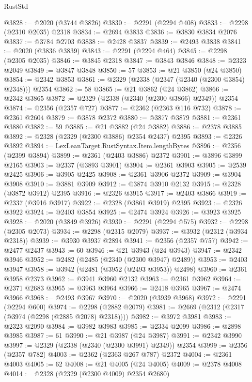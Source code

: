 \begin{lexlean}{RustStd}
\begin{coremodule}
@3828 := @2020 (@3744 @3826)
@3830 := @2291 (@2294 @408)
@3833 := @2298 (@2310 @2035) @2318
@3834 := @2694 @3833
@3836 := @3830 @3834 @2076
@3837 := @3784 @2703
@3838 := @2428 @3837
@3839 := @2493 @3838
@3841 := @2020 (@3836 @3839)
@3843 := @2291 (@2294 @464)
@3845 := @2298 (@2305 @2035)
@3846 := @3845 @2318
@3847 := @3843 @3846
@3848 := @2323 @2049
@3849 := @3847 @3848
@3850 := 57
@3853 := @21 @3850 (@24 @3850)
@3854 := @2342 @3853
@3861 := @2329 (@2338 (@2347 (@2340 (@2300 @3854) @2348))) @2354
@3862 := 58
@3865 := @21 @3862 (@24 @3862)
@3866 := @2342 @3865
@3872 := @2329 (@2338 (@2340 (@2300 @3866) @2349)) @2354
@3874 := @2356 (@2357 @727)
@3877 := @2362 (@2363 @116 @732)
@3878 := @2361 @2604
@3879 := @3878 @2372
@3880 := @3877 @3879
@3881 := @2361 @3880
@3882 := 59
@3885 := @21 @3882 (@24 @3882)
@3886 := @2378 @3885
@3892 := @2328 (@2329 (@2300 @3886) @2354 @2437) @2395
@3893 := @2326 @3892
@3894 := LexLeanTarget.RustSyntax.Item.lengthBytes
@3896 := @2356 (@2399 @3894)
@3899 := @2361 (@2403 @3886) @2372
@3901 := @3896 @3899 @2165
@3903 := @2337 (@3893 @3901)
@3904 := @2361 @3903
@3905 := @2539 @2425
@3906 := @3905 @2425
@3908 := @2361 @3906 @2372
@3909 := @3904 @3908
@3910 := @3881 @3909
@3912 := @3874 @3910 @2132
@3915 := @2328 (@3872 @3912) @2395
@3916 := @2326 @3915
@3917 := @2403 @3866
@3919 := @2337 (@3916 @3917)
@3922 := @2328 (@3861 @3919) @2395
@3923 := @2326 @3922
@3924 := @2403 @3854
@3925 := @2474 @3924
@3926 := @3923 @3925
@3928 := @2020 (@3849 @3926)
@3930 := @2291 (@2294 @575)
@3932 := @2298 (@2305 @2073)
@3934 := @2298 (@2315 @2079)
@3937 := @3932 (@2312 (@3934 @2318))
@3939 := @3930 @3937 @2894
@3941 := @2356 (@2357 @757)
@3942 := @2477 @2437
@3943 := 60
@3946 := @21 @3943 (@24 @3943)
@3947 := @2342 @3946
@3952 := @2482 (@2485 (@2340 (@2300 @3947) @2489))
@3953 := @2403 @3947
@3958 := @3942 (@2481 (@3952 (@2493 @3953)) @2498)
@3960 := @2361 @3958 @2373
@3962 := @3941 @3960 @2132
@3963 := @2361 @3962
@3964 := @2371 @2683
@3965 := @3963 @3964
@3966 := @2418 @3965
@3967 := @2474 @3966
@3968 := @2493 @3967
@3970 := @2020 (@3939 @3968)
@3972 := @2291 (@2294 @600)
@3974 := @2298 (@2882 @2079)
@3981 := @2669 (@2312 (@2317 (@3974 (@2298 (@2885 @2078) @2318))))
@3982 := @3972 @3981
@3983 := @2323 @2090
@3984 := @3982 @3983
@3985 := @2334 @2099
@3986 := @2898 @3985
@3987 := 61
@3990 := @21 @3987 (@24 @3987)
@3991 := @2342 @3990
@3997 := @2329 (@2338 (@2340 (@2300 @3991) @2349)) @2354
@3999 := @2356 (@2357 @782)
@4003 := @2362 (@2363 @267 @787) @2372
@4004 := @2361 @4003
@4005 := 62
@4008 := @21 @4005 (@24 @4005)
@4009 := @2378 @4008
@4014 := @2328 (@2329 (@2300 @4009) @2354 @2680)

\end{coremodule}
\end{lexlean}
